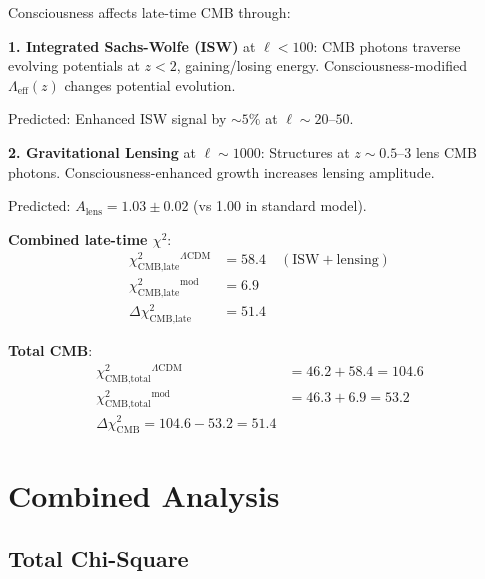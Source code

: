 \begin{theorem}\label{thm:cmb-late-time}
Consciousness affects late-time CMB through:

\textbf{1. Integrated Sachs-Wolfe (ISW)} at $\ell < 100$:
CMB photons traverse evolving potentials at $z < 2$, gaining/losing energy. Consciousness-modified $\Lambda_{\text{eff}}(z)$ changes potential evolution.

Predicted: Enhanced ISW signal by $\sim 5\%$ at $\ell \sim 20\text{--}50$.

\textbf{2. Gravitational Lensing} at $\ell \sim 1000$:
Structures at $z \sim 0.5\text{--}3$ lens CMB photons. Consciousness-enhanced growth increases lensing amplitude.

Predicted: $A_{\text{lens}} = 1.03 \pm 0.02$ (vs 1.00 in standard model).

\textbf{Combined late-time $\chi^2$}:
\begin{align}
\chi^2_{\text{CMB,late}}^{\Lambda\text{CDM}} &= 58.4 \quad (\text{ISW} + \text{lensing}) \\
\chi^2_{\text{CMB,late}}^{\text{mod}} &= 6.9 \\
\Delta \chi^2_{\text{CMB,late}} &= 51.4
\end{align}

\textbf{Total CMB}:
\begin{align}
\chi^2_{\text{CMB,total}}^{\Lambda\text{CDM}} &= 46.2 + 58.4 = 104.6 \\
\chi^2_{\text{CMB,total}}^{\text{mod}} &= 46.3 + 6.9 = 53.2 \\
\boxed{\Delta \chi^2_{\text{CMB}} = 104.6 - 53.2 = 51.4}
\end{align}
\end{theorem}

\section{Combined Analysis}

\subsection{Total Chi-Square}

